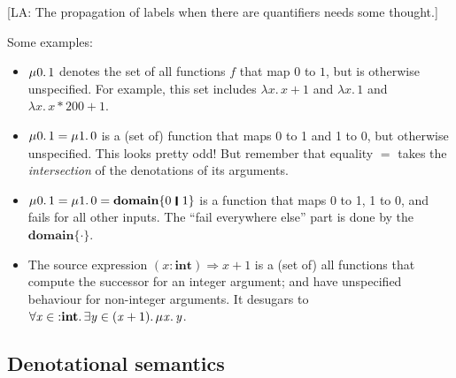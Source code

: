 \documentclass[acmsmall,review,dvipsnames]{acmart}
\newcommand{\Varid}[1]{\mathit{#1}}
\newcommand{\lennart}[1]{{\color{dkcyan} [{LA}: #1]}}
\newcommand{\lennart}[1]{}
\begin{document}
\lennart{The propagation of labels when there are quantifiers needs some thought.}

Some examples:
\begin{itemize}
  \item \ensuremath{\mu\hspace{0.03em}\mathrm{0}.\,\mathrm{1}} denotes the set of all functions \ensuremath{\Varid{f}} that map \ensuremath{\mathrm{0}} to \ensuremath{\mathrm{1}},
  but is otherwise unspecified. For example, this set includes \ensuremath{\lambda\Varid{x}.\,\Varid{x}\mathbin{+}\mathrm{1}} and \ensuremath{\lambda\Varid{x}.\,\mathrm{1}} and \ensuremath{\lambda\Varid{x}.\,\Varid{x}\mathbin{*}\mathrm{200}\mathbin{+}\mathrm{1}}.

  \item \ensuremath{\mu\hspace{0.03em}\mathrm{0}.\,\mathrm{1}\mathrel{=}\mu\hspace{0.03em}\mathrm{1}.\,\mathrm{0}} is a (set of) function that maps 0 to 1
    and 1 to 0, but otherwise unspecified.  This looks pretty odd!  But remember that equality \ensuremath{\mathrel{=}} takes the \emph{intersection} of the denotations of its arguments.

  \item \ensuremath{\mu\hspace{0.03em}\mathrm{0}.\,\mathrm{1}\mathrel{=}\mu\hspace{0.03em}\mathrm{1}.\,\mathrm{0}\mathrel{=}\textbf{domain}\{\mathrm{0}\hspace{0.2em}\mathop{\rule[-0.1em]{0.15em}{0.75em}}\hspace{0.2em}\mathrm{1}\}} is a function
    that maps 0 to 1, 1 to 0, and fails for all other inputs.  The ``fail everywhere else'' part is
    done by the \ensuremath{\textbf{domain}\{\cdot \}}.

  \item The source expression \ensuremath{(\Varid{x}\mathbin{:}\textbf{int})\Rightarrow \Varid{x}\mathbin{+}\mathrm{1}} is a (set of) all functions that compute the successor for an integer argument; and have unspecified behaviour for non-integer arguments.
    It desugars to \ensuremath{\forall\Varid{x}\in\mathbin{:}\textbf{int}.\,\exists\Varid{y}\in(\Varid{x}\mathbin{+}\mathrm{1}).\,\mu\hspace{0.03em}\Varid{x}.\,\Varid{y}}.
\end{itemize}

\subsection{Denotational semantics}
\end{document}
